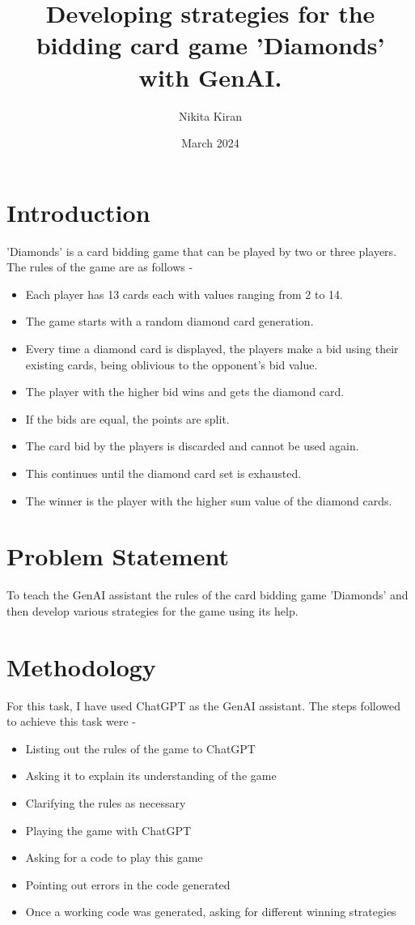 \documentclass{article}
\title{Developing strategies for the bidding card game 'Diamonds' with GenAI.}
\author{Nikita Kiran}
\date{March 2024}
\begin{document}
\maketitle

\section{Introduction}
'Diamonds' is a card bidding game that can be played by two or three players. The rules of the game are as follows - 
\begin{itemize}
    \item Each player has 13 cards each with values ranging from 2 to 14.
    \item The game starts with a random diamond card generation.
    \item Every time a diamond card is displayed, the players make a bid using their existing cards, being oblivious to the opponent’s bid value.
    \item The player with the higher bid wins and gets the diamond card.
    \item If the bids are equal, the points are split.
    \item The card bid by the players is discarded and cannot be used again.
    \item This continues until the diamond card set is exhausted.
    \item The winner is the player with the higher sum value of the diamond cards.
\end{itemize}

\section{Problem Statement}

To teach the GenAI assistant the rules of the card bidding game 'Diamonds' and then develop various strategies for the game using its help.

\section{Methodology}
For this task, I have used ChatGPT as the GenAI assistant. The steps followed to achieve this task were - 
\begin{itemize}
    \item Listing out the rules of the game to ChatGPT
    \item Asking it to explain its understanding of the game
    \item Clarifying the rules as necessary
    \item Playing the game with ChatGPT
    \item Asking for a code to play this game
    \item Pointing out errors in the code generated
    \item Once a working code was generated, asking for different winning strategies
\end{itemize}
\end{document}

